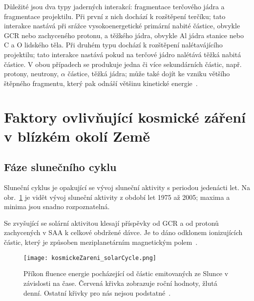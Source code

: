 Důležité jsou dva typy jaderných interakcí: fragmentace terčového jádra a fragmentace projektilu. Při první z nich dochází k rozštěpení terčíku; tato interakce nastává při srážce vysokoenergetické primární nabité částice, obvykle GCR nebo zachyceného protonu, a těžkého jádra, obvykle Al jádra stanice nebo C a O lidského těla. Při druhém typu dochází k rozštěpení nalétavájícího projektilu; tato interakce nastává pokud na terčové jádro nalétává těžká nabitá částice. V obou případech se produkuje jedna či více sekundárních částic, např. protony, neutrony, $\alpha$ částice, těžká jádra; může také dojít ke vzniku většího štěpného fragmentu, který pak odnáší většinu kinetické energie~\cite{benton}. 
 


\section{Faktory ovlivňující kosmické záření v blízkém okolí Země}
\subsection{Fáze slunečního cyklu}\label{sec:kosmickeZareni_solar}
Sluneční cyklus je opakující se vývoj sluneční aktivity s periodou jedenácti let. Na obr.~\ref{fig:kosmickeZareni_solarCycle} je vidět vývoj sluneční aktivity z období let 1975 až 2005; maxima a minima jsou snadno rozpoznatelná.

Se zvyšující se solární aktivitou klesají příspěvky od GCR a od protonů zachycených v SAA k celkové obdržené dávce. Je to dáno odklonem ionizujících částic, který je způsoben meziplanetárním magnetickým polem~\cite{dosis}.
\begin{figure}[h]
  \centering
  \texttt{[image: kosmickeZareni\_solarCycle.png]}
  \caption{Příkon fluence energie pocházející od částic emitovaných ze Slunce v závislosti na čase. Červená křivka zobrazuje roční hodnoty, žlutá denní. Ostatní křivky pro nás nejsou podstatné~\cite{solarCycle_wiki}.}
  \label{fig:kosmickeZareni_solarCycle}
\end{figure}
